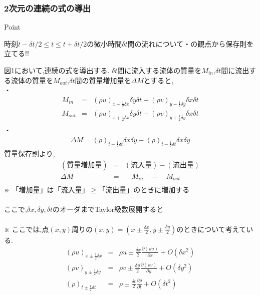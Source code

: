 \documentclass[a4paper]{jsarticle}
\begin{document}
\subsubsection{2次元の連続の式の導出}
\begin{itembox}[l]{Point}
    \begin{center}
        時刻$t-\delta t/2\leq t \leq t+\delta t/2$の微小時間$\delta t$間の流れについて・の観点から保存則を立てる!!
    \end{center}
\end{itembox}
図1において,連続の式を導出する.
\noindent$\delta t$間に流入する流体の質量を$M_{in}$,$\delta t$間に流出する流体の質量を$M_{out}$,$\delta t$間の質量増加量を$\Delta M$とすると,\\
・
\begin{eqnarray*}
    M_{in}&=&\left(\rho u\right)_{x-\frac{1}{2}\delta x}\delta y \delta t+\left(\rho v\right)_{y-\frac{1}{2}\delta y}\delta x \delta t\\
    M_{out}&=&\left(\rho u\right)_{x+\frac{1}{2}\delta x}\delta y \delta t+\left(\rho v\right)_{y+\frac{1}{2}\delta y}\delta x \delta t\\
\end{eqnarray*}
\noindent
・
\begin{eqnarray*}
    \Delta M=\left(\rho\right)_{t+\frac{1}{2}\delta t}\delta x \delta y-\left(\rho\right)_{t-\frac{1}{2}\delta t}\delta x \delta y
\end{eqnarray*}
質量保存則より,
\begin{eqnarray*}
    (質量増加量)&=&(流入量)-(流出量)\\
    \Delta M&=&\quad M_{in}\quad -\quad M_{out}\\
\end{eqnarray*}
※ 「増加量」は「流入量」$\geq$「流出量」のときに増加する\\
\\
ここで,$\delta x, \delta y, \delta t$のオーダまでTaylor級数展開すると\\
\\
※ ここでは,点$(x,y)$周りの$\left(x,y\right)=\left(x\pm \frac{\delta x}{2},y\pm \frac{\delta y}{2}\right)$のときについて考えている.
\begin{eqnarray*}
    \left(\rho u\right)_{x\pm \frac{1}{2}\delta x}&=&\rho u\pm \frac{\delta x}{2}\frac{\partial\left(\rho u\right)}{\partial x}+O\left(\delta x^2\right)\\
    \left(\rho v\right)_{y\pm \frac{1}{2}\delta y}&=&\rho v\pm \frac{\delta y}{2}\frac{\partial\left(\rho v\right)}{\partial y}+O\left(\delta y^2\right)\\
    \left(\rho\right)_{t\pm \frac{1}{2}\delta t}&=&\rho \pm \frac{\delta t}{2}\frac{\partial \rho}{\partial t}+O\left(\delta t^2\right)
\end{eqnarray*}
\end{document}
